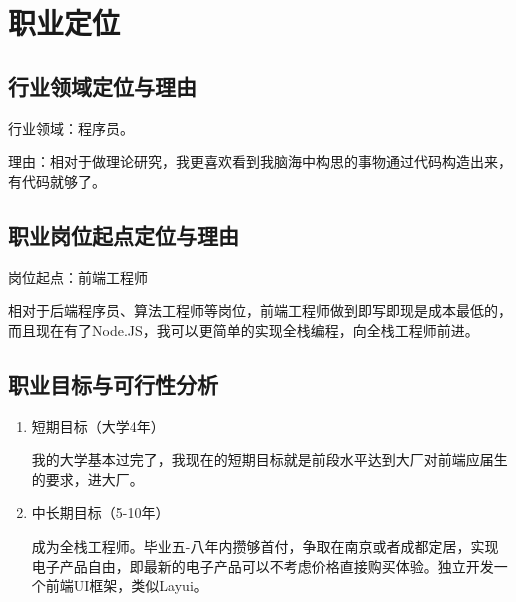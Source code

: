 \documentclass{article}
\begin{document}
\section{职业定位}

\subsection{行业领域定位与理由}
行业领域：程序员。\par
理由：相对于做理论研究，我更喜欢看到我脑海中构思的事物通过代码构造出来，有代码就够了。

\subsection{职业岗位起点定位与理由}
岗位起点：前端工程师\par
相对于后端程序员、算法工程师等岗位，前端工程师做到即写即现是成本最低的，而且现在有了Node.JS，我可以更简单的实现全栈编程，向全栈工程师前进。
\subsection{职业目标与可行性分析}
\begin{enumerate}[(1)]
	\item 短期目标（大学4年）\par
	我的大学基本过完了，我现在的短期目标就是前段水平达到大厂对前端应届生的要求，进大厂。
	\item 中长期目标（5-10年）\par
	成为全栈工程师。毕业五-八年内攒够首付，争取在南京或者成都定居，实现电子产品自由，即最新的电子产品可以不考虑价格直接购买体验。独立开发一个前端UI框架，类似Layui。
\end{enumerate}
\end{document}
